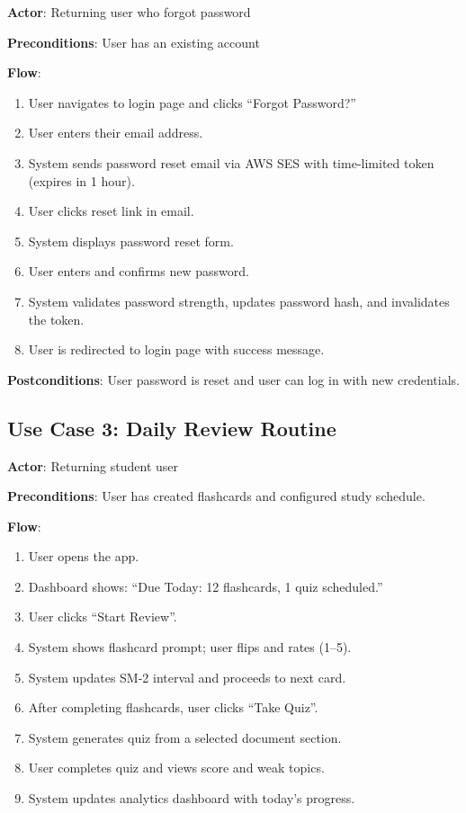 \documentclass[12pt,a4paper]{article}
\begin{document}
\textbf{Actor}: Returning user who forgot password

\textbf{Preconditions}: User has an existing account

\textbf{Flow}:
\begin{enumerate}
    \item User navigates to login page and clicks ``Forgot Password?''
    \item User enters their email address.
    \item System sends password reset email via AWS SES with time-limited token (expires in 1 hour).
    \item User clicks reset link in email.
    \item System displays password reset form.
    \item User enters and confirms new password.
    \item System validates password strength, updates password hash, and invalidates the token.
    \item User is redirected to login page with success message.
\end{enumerate}

\textbf{Postconditions}: User password is reset and user can log in with new credentials.

\subsection*{Use Case 3: Daily Review Routine}

\textbf{Actor}: Returning student user

\textbf{Preconditions}: User has created flashcards and configured study schedule.

\textbf{Flow}:
\begin{enumerate}
    \item User opens the app.
    \item Dashboard shows: ``Due Today: 12 flashcards, 1 quiz scheduled.''
    \item User clicks ``Start Review''.
    \item System shows flashcard prompt; user flips and rates (1--5).
    \item System updates SM-2 interval and proceeds to next card.
    \item After completing flashcards, user clicks ``Take Quiz''.
    \item System generates quiz from a selected document section.
    \item User completes quiz and views score and weak topics.
    \item System updates analytics dashboard with today's progress.
\end{enumerate}
\end{document}
